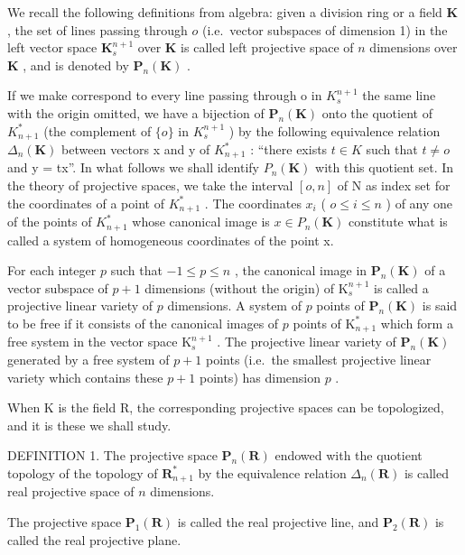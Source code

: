 We recall the following definitions from algebra: given a division ring or a field \(\mathbf{K}\) , the set of lines passing through \(o\) (i.e.~vector subspaces of dimension 1) in the left vector space \(\mathbf{K}_s^{n+1}\) over \(\mathbf{K}\) is called left projective space of \(n\) dimensions over \(\mathbf{K}\) , and is denoted by \(\mathbf{P}_n(\mathbf{K})\) .

If we make correspond to every line passing through o in \(K_{s}^{n+1}\) the same line with the origin omitted, we have a bijection of \(\mathbf{P}_{n}(\mathbf{K})\) onto the quotient of \(K_{n+1}^{*}\) (the complement of \(\{o\}\) in \(K_{s}^{n+1}\) ) by the following equivalence relation \(\Delta_{n}(\mathbf{K})\) between vectors x and y of \(K_{n+1}^{*}\) : ``there exists \(t \in K\) such that \(t \neq o\) and y = tx''. In what follows we shall identify \(P_{n}(\mathbf{K})\) with this quotient set. In the theory of projective spaces, we take the interval \([o, n]\) of N as index set for the coordinates of a point of \(K_{n+1}^{*}\) . The coordinates \(x_{i}\) ( \(o \leqslant i \leqslant n\) ) of any one of the points of \(K_{n+1}^{*}\) whose canonical image is \(x \in P_{n}(\mathbf{K})\) constitute what is called a system of homogeneous coordinates of the point x.

For each integer \(p\) such that \(-1 \leqslant p \leqslant n\) , the canonical image in \(\mathbf{P}_n(\mathbf{K})\) of a vector subspace of \(p + 1\) dimensions (without the origin) of \(\mathrm{K}_s^{n+1}\) is called a projective linear variety of \(p\) dimensions. A system of \(p\) points of \(\mathbf{P}_n(\mathbf{K})\) is said to be free if it consists of the canonical images of \(p\) points of \(\mathrm{K}_{n+1}^*\) which form a free system in the vector space \(\mathrm{K}_s^{n+1}\) . The projective linear variety of \(\mathbf{P}_n(\mathbf{K})\) generated by a free system of \(p + 1\) points (i.e.~the smallest projective linear variety which contains these \(p + 1\) points) has dimension \(p\) .

When K is the field R, the corresponding projective spaces can be topologized, and it is these we shall study.

DEFINITION 1. The projective space \(\mathbf{P}_n(\mathbf{R})\) endowed with the quotient topology of the topology of \(\mathbf{R}_{n+1}^*\) by the equivalence relation \(\Delta_n(\mathbf{R})\) is called real projective space of \(n\) dimensions.

The projective space \(\mathbf{P}_{1}(\mathbf{R})\) is called the real projective line, and \(\mathbf{P}_{2}(\mathbf{R})\) is called the real projective plane.

